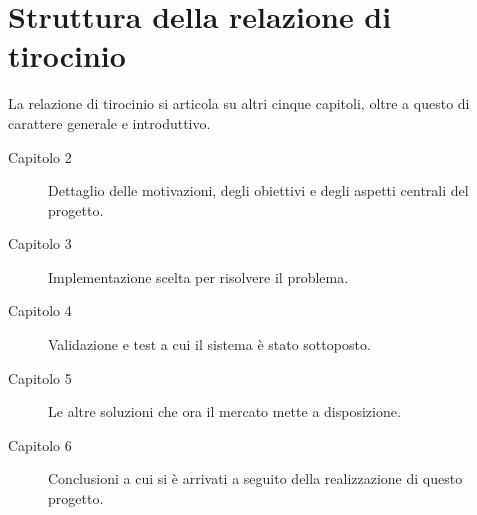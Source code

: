 
\section{Struttura della relazione di tirocinio}
{{\samepage
La relazione di tirocinio si articola su altri cinque capitoli, oltre a questo di carattere generale e introduttivo.
\begin{description}
\item[Capitolo 2] Dettaglio delle motivazioni, degli obiettivi e degli aspetti centrali del progetto.
\item[Capitolo 3] Implementazione scelta per risolvere il problema.
\item[Capitolo 4] Validazione e test a cui il sistema è stato sottoposto.
\item[Capitolo 5] Le altre soluzioni che ora il mercato mette a disposizione.
\item[Capitolo 6] Conclusioni a cui si è arrivati a seguito della realizzazione di questo progetto.
\end{description}
}}